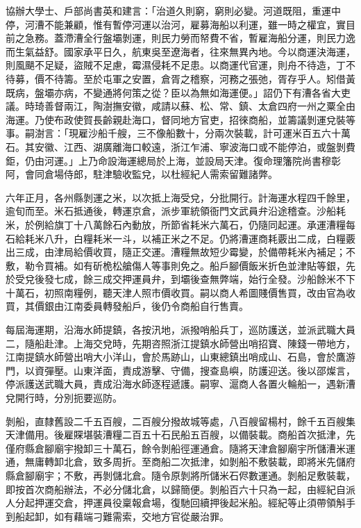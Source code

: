 \begin{pinyinscope}
協辦大學士、戶部尚書英和建言：「治道久則窮，窮則必變。河道既阻，重運中停，河漕不能兼顧，惟有暫停河運以治河，雇募海船以利運，雖一時之權宜，實目前之急務。蓋滯漕全行盤壩剝運，則民力勞而帑費不省，暫雇海船分運，則民力逸而生氣益舒。國家承平日久，航東吳至遼海者，往來無異內地。今以商運決海運，則風颶不足疑，盜賊不足慮，霉濕侵耗不足患。以商運代官運，則舟不待造，丁不待募，價不待籌。至於屯軍之安置，倉胥之稽察，河務之張弛，胥存乎人。矧借黃既病，盤壩亦病，不變通將何策之從？臣以為無如海運便。」詔仍下有漕各省大吏議。時琦善督兩江，陶澍撫安徽，咸請以蘇、松、常、鎮、太倉四府一州之粟全由海運。乃使布政使賀長齡親赴海口，督同地方官吏，招徠商船，並籌議剝運兌裝等事。嗣澍言：「現雇沙船千艘，三不像船數十，分兩次裝載，計可運米百五六十萬石。其安徽、江西、湖廣離海口較遠，浙江乍浦、寧波海口或不能停泊，或盤剝費鉅，仍由河運。」上乃命設海運總局於上海，並設局天津。復命理籓院尚書穆彰阿，會同倉場侍郎，駐津驗收監兌，以杜經紀人需索留難諸弊。

六年正月，各州縣剝運之米，以次抵上海受兌，分批開行。計海運水程四千餘里，逾旬而至。米石抵通後，轉運京倉，派步軍統領衙門文武員弁沿途稽查。沙船耗米，於例給旗丁十八萬餘石內動放，所節省耗米六萬石，仍隨同起運。承運漕糧每石給耗米八升，白糧耗米一斗，以補正米之不足。仍將漕運商耗覈出二成，白糧覈出三成，由津局給價收買，隨正交運。漕糧無故短少霉變，於備帶耗米內補足；不敷，勒令買補。如有斫桅松艙傷人等事則免之。船戶腳價飯米折色並津貼等銀，先於受兌後發七成，餘三成交押運員弁，到壩後查無弊端，始行全發。沙船餘米不下十萬石，初照南糧例，聽天津人照市價收買。嗣以商人希圖賤價售買，改由官為收買，其價銀由江南委員轉發船戶，後仍令商船自行售賣。

每屆海運期，沿海水師提鎮，各按汛地，派撥哨船兵丁，巡防護送，並派武職大員二，隨船赴津。上海交兌時，先期咨照浙江提鎮水師營出哨招寶、陳錢一帶地方，江南提鎮水師營出哨大小洋山，會於馬跡山，山東總鎮出哨成山、石島，會於鷹游門，以資彈壓。山東洋面，責成游擊、守備，搜查島嶼，防護迎送。後以邵燦言，停派護送武職大員，責成沿海水師逐程遞護。嗣寧、滬商人各置火輪船一，遇新漕兌開行時，分別扼要巡防。

剝船，直隸舊設二千五百艘，二百艘分撥故城等處，八百艘留楊村，餘千五百艘集天津備用。後雇賝堪裝漕糧二百五十石民船五百艘，以備裝載。商船首次抵津，先僅府縣倉腳廟宇撥卸三十萬石，餘令剝船徑運通倉。隨將天津倉腳廟宇所儲漕米運通，無庸轉卸北倉，致多周折。至商船二次抵津，如剝船不敷裝載，即將米先儲府縣倉腳廟宇；不敷，再剝儲北倉。隨令原剝將所儲米石侭數運通。剝船足敷裝載，即按首次商船辦法，不必分儲北倉，以歸簡便。剝船百六十只為一起，由經紀自派人分起押運交倉，押運員役稟報倉場，復馳回續押後起米船。經紀等止須帶領斛手到船起卸，如有藉端刁難需索，交地方官從嚴治罪。


\end{pinyinscope}
